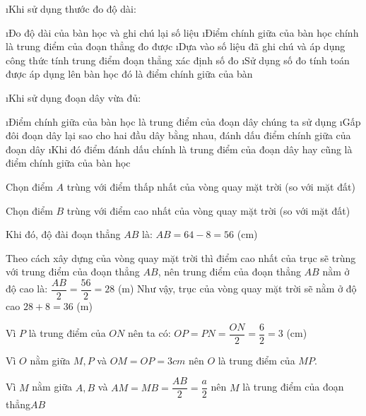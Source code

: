 \begin{Answer}{23}
		\begin{enumerate}[a),leftmargin=*]
			\i Khi sử dụng thước đo độ dài:
			\begin{enumerate}[+,leftmargin=*]
				\i Đo độ dài của bàn học và ghi chú lại số liệu
				\i Điểm chính giữa của bàn học chính là trung điểm của đoạn thẳng đo được
				\i Dựa vào số liệu đã ghi chú và áp dụng công thức tính trung điểm đoạn thẳng xác định số đo
				\i Sử dụng số đo tính toán được áp dụng lên bàn học đó là điểm chính giữa của bàn
			\end{enumerate}
			\i Khi sử dụng đoạn dây vừa đủ:
			\begin{enumerate}[+,leftmargin=*]
				\i Điểm chính giữa của bàn học là trung điểm của đoạn dây chúng ta sử dụng
				\i Gấp đôi đoạn dây lại sao cho hai đầu dây bằng nhau, đánh dấu điểm chính giữa của đoạn dây
				\i Khi đó điểm đánh dấu chính là trung điểm của đoạn dây hay cũng là điểm chính giữa của bàn học
			\end{enumerate}
		\end{enumerate}
	
\end{Answer}
\begin{Answer}{24}
		Chọn điểm $A$  trùng với điểm thấp nhất của vòng quay mặt trời (so với mặt đất)
		
		Chọn điểm $B$  trùng với điểm cao nhất của vòng quay mặt trời (so với mặt đất)
		
		Khi đó, độ đài đoạn thẳng  $AB$ là: $AB = 64-8 = 56$ (cm)
		
		Theo cách xây dựng của vòng quay mặt trời thì điểm cao nhất của trục sẽ trùng với trung điểm của đoạn thẳng  $AB$, nên trung điểm của đoạn thẳng $AB$ nằm ở độ cao là: $\dfrac{AB}{2} = \dfrac{56}{2} = 28$ (m)
		Như vậy, trục của vòng quay mặt trời sẽ nằm ở độ cao $28 + 8 = 36$ (m)
	
\end{Answer}
\begin{Answer}{25}
		Vì $P$ là trung điểm của $ON$ nên ta có: $OP = PN = \dfrac{ON}{2} = \dfrac{6}{2} = 3$ (cm)
		
		Vì $O$ nằm giữa $M,P$ và $OM=OP=3cm$ nên $O$ là trung điểm của $MP$.
	
\end{Answer}
\begin{Answer}{26}
		Vì $M$ nằm giữa $A,B$ và $AM=MB=\dfrac{AB}{2}=\dfrac{a}{2}$ nên $M$ là trung điểm của đoạn thẳng$AB$
		\begin{center}
		\end{center}
	
\end{Answer}
